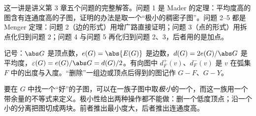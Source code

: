 \label{lec:yan-ch3-problems}

这一讲是讲义第 3 章五个问题的完整解答。问题 1 是 Mader 的定理：平均度高的图含有连通度高的子图，证明的办法是取一个“极小的稠密子图”。问题 2--5 都是 Menger 定理：问题 2（边的形式）用增广路直接证明；问题 3（点的形式）用拆点化归到问题 2；问题 4 与问题 5 再化归到问题 2、3，后者用的是加点。

记号：$\abs G$ 是顶点数，$e(G)=\abs{E(G)}$ 是边数，$d(G)=2e(G)/\abs G$ 是平均度，$\varepsilon(G)=e(G)/\abs G=d(G)/2$。有向图中 $d_F^+(v)$、$d_F^-(v)$ 是 $v$ 在弧集 $F$ 中的出度与入度。“删除”一组边或顶点后得到的图记作 $G-F$、$G-Y$。


要在 $G$ 中找一个“好”的子图，可以在一族子图中取\emph{极小}的一个，而这一族用一个带余量的不等式来定义。极小性给出两种操作都不能做：删一个低度顶点；沿一个小的分离把图切成两块。前者推出最小度大，后者推出连通度高。

